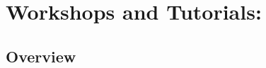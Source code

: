 
\chapter{Workshops and Tutorials: \daydate}
\thispagestyle{emptyheader}
\setlength{\parindent}{0in}
\setlength{\parskip}{2ex}
\renewcommand{\baselinestretch}{0.87}

\newcommand{\tutorialmorningtime}{09:00--12:30}
\newcommand{\tutorialafternoontime}{14:00--17:30}
\newcommand{\tutol}{\hspace{-.25in}}
\section*{Overview}
\renewcommand{\arraystretch}{1.2}
